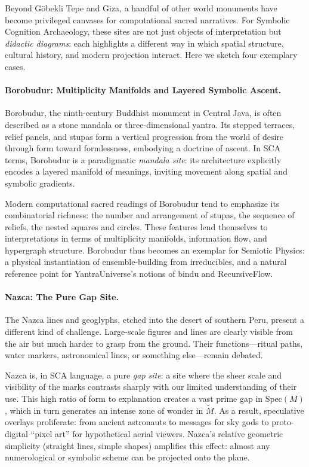 \documentclass[12]{amsart}
\theoremstyle{plain}
\begin{document}
Beyond Göbekli Tepe and Giza, a handful of other world monuments have become privileged canvases for computational sacred narratives. For Symbolic Cognition Archaeology, these sites are not just objects of interpretation but \emph{didactic diagrams}: each highlights a different way in which spatial structure, cultural history, and modern projection interact. Here we sketch four exemplary cases.

\paragraph{Borobudur: Multiplicity Manifolds and Layered Symbolic Ascent.}

Borobudur, the ninth-century Buddhist monument in Central Java, is often described as a stone mandala or three-dimensional yantra. Its stepped terraces, relief panels, and stupas form a vertical progression from the world of desire through form toward formlessness, embodying a doctrine of ascent. In SCA terms, Borobudur is a paradigmatic \emph{mandala site}: its architecture explicitly encodes a layered manifold of meanings, inviting movement along spatial and symbolic gradients.

Modern computational sacred readings of Borobudur tend to emphasize its combinatorial richness: the number and arrangement of stupas, the sequence of reliefs, the nested squares and circles. These features lend themselves to interpretations in terms of multiplicity manifolds, information flow, and hypergraph structure. Borobudur thus becomes an exemplar for Semiotic Physics: a physical instantiation of ensemble-building from irreducibles, and a natural reference point for YantraUniverse's notions of bindu and RecursiveFlow.

\paragraph{Nazca: The Pure Gap Site.}

The Nazca lines and geoglyphs, etched into the desert of southern Peru, present a different kind of challenge. Large-scale figures and lines are clearly visible from the air but much harder to grasp from the ground. Their functions—ritual paths, water markers, astronomical lines, or something else—remain debated.

Nazca is, in SCA language, a pure \emph{gap site}: a site where the sheer scale and visibility of the marks contrasts sharply with our limited understanding of their use. This high ratio of form to explanation creates a vast prime gap in $\mathrm{Spec}(M)$, which in turn generates an intense zone of wonder in $\tilde M$. As a result, speculative overlays proliferate: from ancient astronauts to messages for sky gods to proto-digital ``pixel art'' for hypothetical aerial viewers. Nazca's relative geometric simplicity (straight lines, simple shapes) amplifies this effect: almost any numerological or symbolic scheme can be projected onto the plane.
\end{document}
